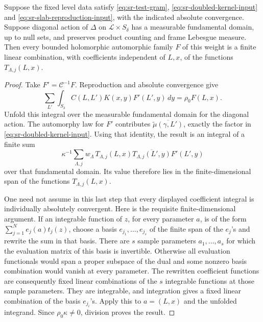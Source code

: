 \begin{srproposition}
\label{prop:sr-gram-theta-span}
Suppose the fixed level data satisfy
\eqref{eq:sr-test-gram},
\eqref{eq:sr-doubled-kernel-input} and
\eqref{eq:sr-slab-reproduction-input}, with the indicated absolute
convergence.  Suppose diagonal action of \(\Delta\) on
\(\mathcal L\times S_\delta\) has a measurable fundamental domain,
up to null sets, and preserves product counting and frame
Lebesgue measure.  Then every bounded holomorphic automorphic
family \(F\) of this weight is a finite linear combination, with
coefficients independent of \(L,x\), of the functions
\(T_{\Lambda,j}(L,x)\).
\end{srproposition}

\begin{proof}
Take \(F'=\mathcal C^{-1}F\).
Reproduction and absolute convergence give
\[
 \sum_{L'}\int_{S_\delta}
       C(L,L')K(x,y)F'(L',y)\,dy=\rho_0F(L,x).
\]
Unfold this integral over the measurable fundamental domain for
the diagonal action.
The automorphy law for \(F'\) contributes
\(\overline{\widetilde\mu(\gamma,L')}\), exactly the factor in
\eqref{eq:sr-doubled-kernel-input}.
Using that identity, the result is an integral of a finite sum
\[
 \kappa^{-1}\sum_{\Lambda,j}
   w_\Lambda\,T_{\Lambda,j}(L,x)
       \overline{T_{\Lambda,j}(L',y)}F'(L',y)
\]
over that fundamental domain.  Its value therefore lies in the
finite-dimensional span of the functions
\(T_{\Lambda,j}(L,x)\).

One need not assume in this last step that every displayed
coefficient integral is individually absolutely convergent.
Here is the requisite finite-dimensional argument.
If an integrable function of \(z\), for every parameter \(a\), is
of the form \(\sum_{j=1}^N e_j(a)t_j(z)\), choose a basis
\(e_{j_1},\ldots,e_{j_s}\) of the finite span of the \(e_j\)'s and
rewrite the sum in that basis.  There are \(s\) sample parameters
\(a_1,\ldots,a_s\) for which the evaluation matrix of this basis
is invertible.  Otherwise all evaluation functionals would span a
proper subspace of the dual and some nonzero basis combination
would vanish at every parameter.
The rewritten coefficient functions are consequently fixed
linear combinations of the \(s\) integrable functions at those
sample parameters.  They are integrable, and integration gives
a fixed linear combination of the basis \(e_{j_i}\)'s.
Apply this to \(a=(L,x)\) and the unfolded integrand.
Since \(\rho_0\kappa\ne0\), division proves the result.
\end{proof}

